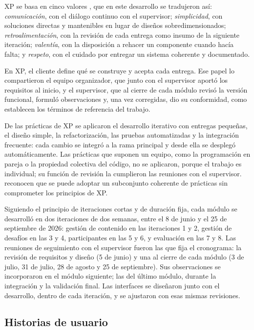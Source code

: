 XP se basa en cinco valores \parencite{beck2004}, que en este desarrollo se tradujeron así: \textit{comunicación}, con el diálogo continuo con el supervisor; \textit{simplicidad}, con soluciones directas y mantenibles en lugar de diseños sobredimensionados; \textit{retroalimentación}, con la revisión de cada entrega como insumo de la siguiente iteración; \textit{valentía}, con la disposición a rehacer un componente cuando hacía falta; y \textit{respeto}, con el cuidado por entregar un sistema coherente y documentado.

En XP, el cliente define qué se construye y acepta cada entrega. Ese papel lo compartieron el equipo organizador, que junto con el supervisor aportó los requisitos al inicio, y el supervisor, que al cierre de cada módulo revisó la versión funcional, formuló observaciones y, una vez corregidas, dio su conformidad, como establecen los términos de referencia del trabajo.

De las prácticas de XP se aplicaron el desarrollo iterativo con entregas pequeñas, el diseño simple, la refactorización, las pruebas automatizadas y la integración frecuente: cada cambio se integró a la rama principal y desde ella se desplegó automáticamente. Las prácticas que suponen un equipo, como la programación en pareja o la propiedad colectiva del código, no se aplicaron, porque el trabajo es individual; su función de revisión la cumplieron las reuniones con el supervisor. \textcite{shore2021} reconocen que se puede adoptar un subconjunto coherente de prácticas sin comprometer los principios de XP.

Siguiendo el principio de iteraciones cortas y de duración fija, cada módulo se desarrolló en dos iteraciones de dos semanas, entre el 8 de junio y el 25 de septiembre de 2026: gestión de contenido en las iteraciones 1 y 2, gestión de desafíos en las 3 y 4, participantes en las 5 y 6, y evaluación en las 7 y 8. Las reuniones de seguimiento con el supervisor fueron las que fija el cronograma: la revisión de requisitos y diseño (5 de junio) y una al cierre de cada módulo (3 de julio, 31 de julio, 28 de agosto y 25 de septiembre). Sus observaciones se incorporaron en el módulo siguiente; las del último módulo, durante la integración y la validación final. Las interfaces se diseñaron junto con el desarrollo, dentro de cada iteración, y se ajustaron con esas mismas revisiones.

\subsection{Historias de usuario}

